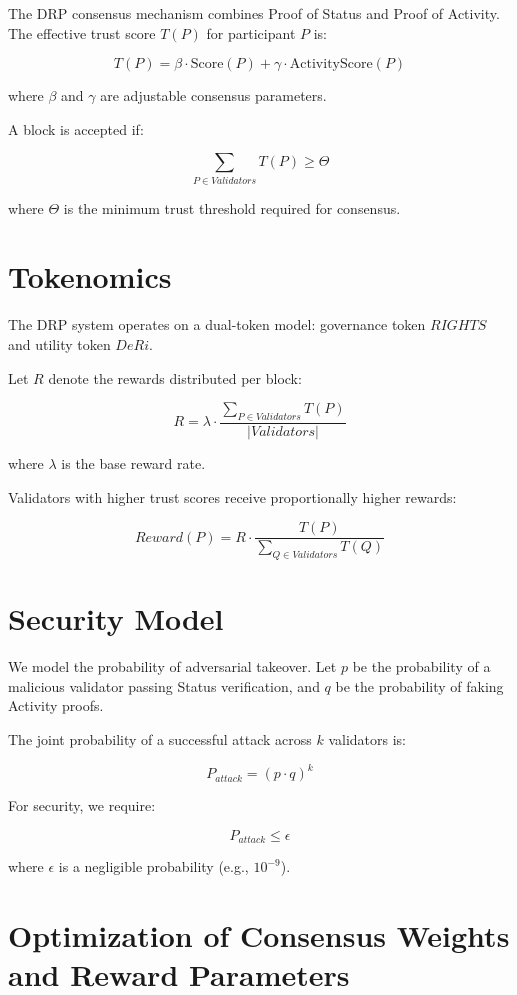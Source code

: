 \documentclass[11pt,a4paper]{article}
\begin{document}
The DRP consensus mechanism combines Proof of Status and Proof of Activity.  
The effective trust score $T(P)$ for participant $P$ is:

\[
T(P) = \beta \cdot \text{Score}(P) + \gamma \cdot \text{ActivityScore}(P)
\]

where $\beta$ and $\gamma$ are adjustable consensus parameters.  

A block is accepted if:

\[
\sum_{P \in Validators} T(P) \geq \Theta
\]

where $\Theta$ is the minimum trust threshold required for consensus.
\section{Tokenomics}

The DRP system operates on a dual-token model: governance token $RIGHTS$ 
and utility token $DeRi$.  

Let $R$ denote the rewards distributed per block:

\[
R = \lambda \cdot \frac{\sum_{P \in Validators} T(P)}{|Validators|}
\]

where $\lambda$ is the base reward rate.  

Validators with higher trust scores receive proportionally higher rewards:

\[
Reward(P) = R \cdot \frac{T(P)}{\sum_{Q \in Validators} T(Q)}
\]
\section{Security Model}

We model the probability of adversarial takeover.  
Let $p$ be the probability of a malicious validator passing Status verification, 
and $q$ be the probability of faking Activity proofs.  

The joint probability of a successful attack across $k$ validators is:

\[
P_{attack} = (p \cdot q)^k
\]

For security, we require:

\[
P_{attack} \leq \epsilon
\]

where $\epsilon$ is a negligible probability (e.g., $10^{-9}$).


\section{Optimization of Consensus Weights and Reward Parameters}
\end{document}
